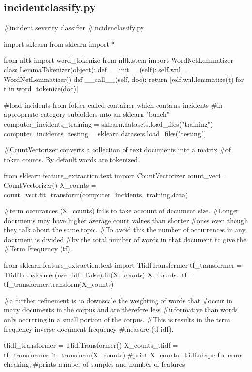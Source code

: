 \subsection{incidentclassify.py}
\label{incident_classify.py}
\begin{pyverbatim}
#incident severity classifier
#incidenclassify.py


import sklearn
from sklearn import *

from nltk import word_tokenize          
from nltk.stem import WordNetLemmatizer 
class LemmaTokenizer(object):
    def __init__(self):
         self.wnl = WordNetLemmatizer()
    def __call__(self, doc):
         return [self.wnl.lemmatize(t) for t in word_tokenize(doc)]


#load incidents from folder called container which contains incidents 
#in appropriate category subfolders into an sklearn "bunch"
computer_incidents_training = sklearn.datasets.load_files("training")
computer_incidents_testing = sklearn.datasets.load_files("testing")

#CountVectorizer converts a collection of text documents into a matrix 
#of token counts. By default words are tokenized.

from sklearn.feature_extraction.text import CountVectorizer
count_vect = CountVectorizer()
X_counts = count_vect.fit_transform(computer_incidents_training.data)

#term occurances (X_counts) fails to take account of document size. 
#Longer documents may have higher average count values than shorter 
#ones even though they talk about the same topic. 
#To avoid this the number of occurrences in any document is divided 
#by the total number of words in that document to give the 
#Term Frequency (tf).

from sklearn.feature_extraction.text import TfidfTransformer
tf_transformer = TfidfTransformer(use_idf=False).fit(X_counts)
X_counts_tf = tf_transformer.transform(X_counts)

#a further refinement is to downscale the weighting of words that 
#occur in many documents in the corpus and are therefore less 
#informative than words only occurring in a small portion of the corpus. 
#This is results in the term frequency inverse document frequency 
#measure (tf-idf).

tfidf_transformer = TfidfTransformer()
X_counts_tfidf = tf_transformer.fit_transform(X_counts)
#print X_counts_tfidf.shape for error checking, 
#prints number of samples and number of features


\end{pyverbatim}
